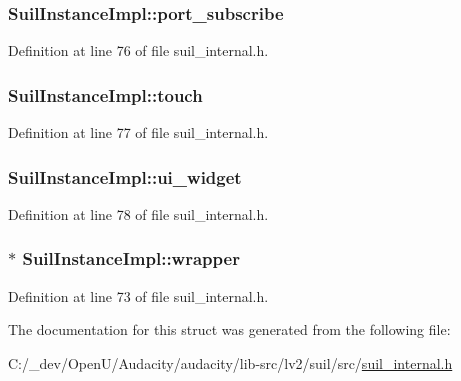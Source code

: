 \subsubsection[{\texorpdfstring{port\+\_\+subscribe}{port_subscribe}}]{ Suil\+Instance\+Impl\+::port\+\_\+subscribe}\hypertarget{struct_suil_instance_impl_a05194c349aef7034546c5f5e6042ffea}{}\label{struct_suil_instance_impl_a05194c349aef7034546c5f5e6042ffea}


Definition at line 76 of file suil\+\_\+internal.\+h.

\subsubsection[{\texorpdfstring{touch}{touch}}]{ Suil\+Instance\+Impl\+::touch}\hypertarget{struct_suil_instance_impl_a6bb87e7a38ae333ceefe9de1c495721b}{}\label{struct_suil_instance_impl_a6bb87e7a38ae333ceefe9de1c495721b}


Definition at line 77 of file suil\+\_\+internal.\+h.

\subsubsection[{\texorpdfstring{ui\+\_\+widget}{ui_widget}}]{ Suil\+Instance\+Impl\+::ui\+\_\+widget}\hypertarget{struct_suil_instance_impl_a259ac497128c4b01357a85eb6e6e507a}{}\label{struct_suil_instance_impl_a259ac497128c4b01357a85eb6e6e507a}


Definition at line 78 of file suil\+\_\+internal.\+h.

\subsubsection[{\texorpdfstring{wrapper}{wrapper}}]{$\ast$ Suil\+Instance\+Impl\+::wrapper}\hypertarget{struct_suil_instance_impl_ac1a0aada788cd64d0ee86e8e35dc32b1}{}\label{struct_suil_instance_impl_ac1a0aada788cd64d0ee86e8e35dc32b1}


Definition at line 73 of file suil\+\_\+internal.\+h.



The documentation for this struct was generated from the following file\+:\begin{DoxyCompactItemize}
\item 
C\+:/\+\_\+dev/\+Open\+U/\+Audacity/audacity/lib-\/src/lv2/suil/src/\hyperlink{suil__internal_8h}{suil\+\_\+internal.\+h}\end{DoxyCompactItemize}
